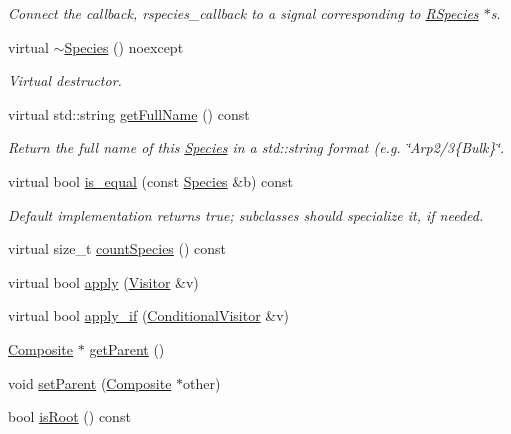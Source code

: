 \begin{DoxyCompactItemize}
\begin{DoxyCompactList}\small\item\em Connect the callback, rspecies\-\_\-callback to a signal corresponding to \hyperlink{classchem_1_1RSpecies}{R\-Species} $\ast$s. \end{DoxyCompactList}\item 
virtual \hyperlink{classchem_1_1Species_afb5803da12a3192f0c1b5bcbea4054d7}{$\sim$\-Species} () noexcept
\begin{DoxyCompactList}\small\item\em Virtual destructor. \end{DoxyCompactList}\item 
virtual std\-::string \hyperlink{classchem_1_1Species_a7ac7196a7146f63e297d0995c6081f4b}{get\-Full\-Name} () const 
\begin{DoxyCompactList}\small\item\em Return the full name of this \hyperlink{classchem_1_1Species}{Species} in a std\-::string format (e.\-g. \char`\"{}\-Arp2/3\{\-Bulk\}\char`\"{}. \end{DoxyCompactList}\item 
virtual bool \hyperlink{classchem_1_1Species_ac01be786c36974eb1e288b1bfdbf02f2}{is\-\_\-equal} (const \hyperlink{classchem_1_1Species}{Species} \&b) const 
\begin{DoxyCompactList}\small\item\em Default implementation returns true; subclasses should specialize it, if needed. \end{DoxyCompactList}\item 
virtual size\-\_\-t \hyperlink{classchem_1_1Species_a5e8aedfe4c4b5e08fb0ee672c3d80ace}{count\-Species} () const 
\item 
virtual bool \hyperlink{classchem_1_1Component_ae9efcf2fb203ab7514f81f04d7e4dec2}{apply} (\hyperlink{classchem_1_1Visitor}{Visitor} \&v)
\item 
virtual bool \hyperlink{classchem_1_1Component_ac40e9d75a554324ba1d007a2d5234a38}{apply\-\_\-if} (\hyperlink{classchem_1_1ConditionalVisitor}{Conditional\-Visitor} \&v)
\item 
\hyperlink{classchem_1_1Composite}{Composite} $\ast$ \hyperlink{classchem_1_1Component_a32812270ee52f07ceae2194c56864fd6}{get\-Parent} ()
\item 
void \hyperlink{classchem_1_1Component_a1f4e4d1566f1d3026f1e2a14fa3dffd9}{set\-Parent} (\hyperlink{classchem_1_1Composite}{Composite} $\ast$other)
\item 
bool \hyperlink{classchem_1_1Component_a75cd13a0d884f82fcddd574de33fbfe6}{is\-Root} () const 

\end{DoxyCompactItemize}

